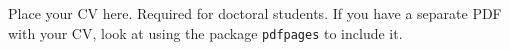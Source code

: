 Place your CV here. Required for doctoral students.
If you have a separate PDF with your CV, look at using the package
\texttt{pdfpages} to include it.
